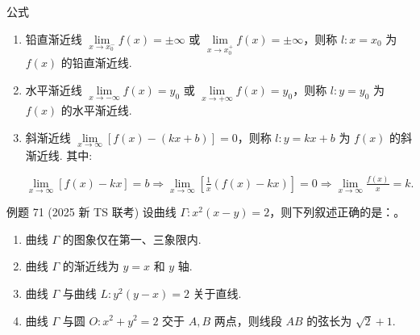 \documentclass{ctexart}
\begin{document}
\begin{formulaBox}{公式}
    \begin{enumerate}[label=\Roman*., labelindent=0pt, leftmargin=*, itemsep=8pt]
        \item 铅直渐近线 $\lim\limits_{x \to x_0^-} f(x) = \pm\infty$ 或 $\lim\limits_{x \to x_0^+} f(x) = \pm\infty$，则称 $l: x=x_0$ 为 $f(x)$ 的铅直渐近线.
        
        \item 水平渐近线 $\lim\limits_{x \to -\infty} f(x) = y_0$ 或 $\lim\limits_{x \to +\infty} f(x) = y_0$，则称 $l: y=y_0$ 为 $f(x)$ 的水平渐近线.
        
        \item 斜渐近线 $\lim\limits_{x \to \infty} [f(x) - (kx+b)] = 0$，则称 $l: y=kx+b$ 为 $f(x)$ 的斜渐近线. 其中:
        \begin{center}
             $\lim\limits_{x \to \infty} [f(x) - kx] = b \Rightarrow \lim\limits_{x \to \infty} \left[\frac{1}{x}(f(x) - kx)\right] = 0 \Rightarrow \lim\limits_{x \to \infty} \frac{f(x)}{x} = k.$
        \end{center}
    \end{enumerate}
\end{formulaBox}

\vspace{1em}

\begin{exampleBox}{例题 71}
    (2025 新 TS 联考) 设曲线 $\Gamma: x^2(x-y) = 2$，则下列叙述正确的是：\underline{\hspace{3cm}}。

    \begin{enumerate}[label=\Alph*., labelindent=0pt, leftmargin=*, itemsep=4pt]
        \item 曲线 $\Gamma$ 的图象仅在第一、三象限内.
        \item 曲线 $\Gamma$ 的渐近线为 $y = x$ 和 $y$ 轴.
        \item 曲线 $\Gamma$ 与曲线 $L: y^2(y-x) = 2$ 关于直线.
        \item 曲线 $\Gamma$ 与圆 $O: x^2 + y^2 = 2$ 交于 $A, B$ 两点，则线段 $AB$ 的弦长为 $\sqrt{2} + 1$.
    \end{enumerate}
\end{exampleBox}

\vspace{1em}
\end{document}
